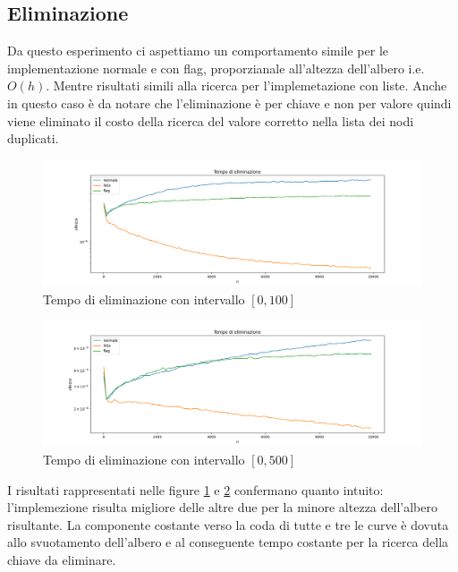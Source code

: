 \documentclass{article}
\begin{document}
\subsection{Eliminazione}
Da questo esperimento ci aspettiamo un comportamento simile per le implementazione normale e con flag, proporzianale all'altezza dell'albero i.e. \( O(h) \). Mentre risultati simili alla ricerca per l'implemetazione con liste. Anche in questo caso è da notare che l'eliminazione è per chiave e non per valore quindi viene eliminato il costo della ricerca del valore corretto nella lista dei nodi duplicati.
\begin{figure}[H]
\centering
  \centering
  \includegraphics[width=\linewidth]{img/delete_graph_100_log.png}
  \caption{Tempo di eliminazione con intervallo \( [0, 100] \) }
  \label{delete100}
\end{figure}
\begin{figure}[H]
\centering
  \centering
  \includegraphics[width=\linewidth]{img/delete_graph_500_log.png}
  \caption{Tempo di eliminazione con intervallo \( [0, 500] \) }
  \label{delete500}
\end{figure}
I risultati rappresentati nelle figure \ref{delete100} e \ref{delete500} confermano quanto intuito: l'implemezione risulta migliore delle altre due per la minore altezza dell'albero risultante. La componente costante verso la coda di tutte e tre le curve è dovuta allo svuotamento dell'albero e al conseguente tempo costante per la ricerca della chiave da eliminare.
\end{document}
